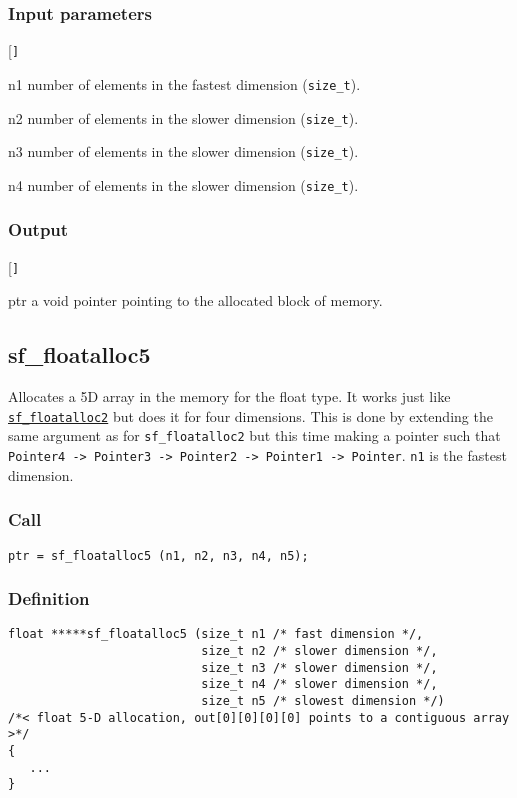\subsubsection*{Input parameters}
\begin{desclist}{\tt }{\quad}[\tt ]
   \setlength\itemsep{0pt}
   \item[n1] number of elements in the fastest dimension (\texttt{size\_t}).
   \item[n2] number of elements in the slower dimension (\texttt{size\_t}).
   \item[n3] number of elements in the slower dimension (\texttt{size\_t}).
   \item[n4] number of elements in the slower dimension (\texttt{size\_t}).
\end{desclist}

\subsubsection*{Output}
\begin{desclist}{\tt }{\quad}[\tt ]
   \setlength\itemsep{0pt}
   \item[ptr] a void pointer pointing to the allocated block of memory.
\end{desclist}




\subsection{{sf\_floatalloc5}}
Allocates a 5D array in the memory for the float type. It works just like \hyperref[sec:sf_floatalloc2]{\texttt{sf\_floatalloc2}} but does it for four dimensions. This is done by extending the same argument as for \texttt{sf\_floatalloc2} but this time making a pointer such that \texttt{Pointer4 -> Pointer3 -> Pointer2 -> Pointer1 -> Pointer}. \texttt{n1} is the fastest dimension.


\subsubsection*{Call}
\begin{verbatim}ptr = sf_floatalloc5 (n1, n2, n3, n4, n5);\end{verbatim}


\subsubsection*{Definition}
\begin{verbatim}
float *****sf_floatalloc5 (size_t n1 /* fast dimension */, 
                           size_t n2 /* slower dimension */, 
                           size_t n3 /* slower dimension */, 
                           size_t n4 /* slower dimension */,
                           size_t n5 /* slowest dimension */)
/*< float 5-D allocation, out[0][0][0][0] points to a contiguous array >*/ 
{
   ...
}
\end{verbatim}

